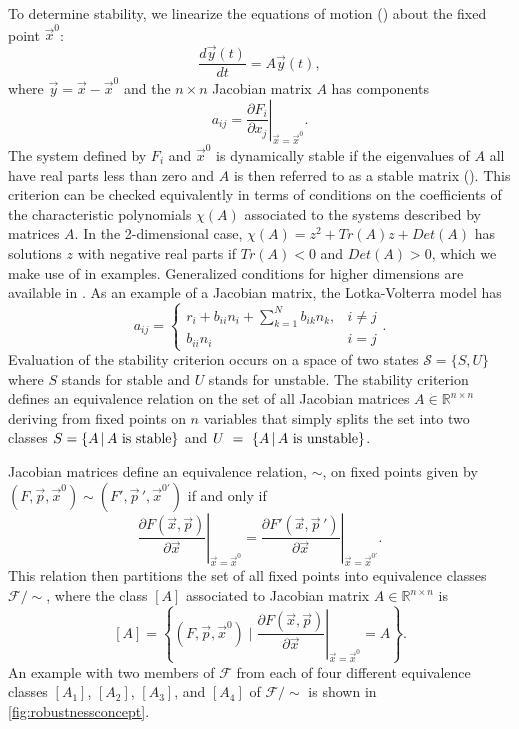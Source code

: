 To determine stability, we linearize the equations of motion () about the
fixed point $\vec{x}^0$:
\begin{equation}\label{eq:lineardynsys}
\frac{d\vec{y}(t)}{dt} = A \vec{y}(t),
\end{equation}
where $\vec{y} = \vec{x} - \vec{x}^0$ and the $n \times n$ Jacobian matrix $A$ has components
$$
a_{ij} = \left. \frac{\partial F_i}{\partial x_j} \right|_{\vec{x} = \vec{x}^0}.
$$
The system defined by $F_i$ and $\vec{x}^0$ is dynamically stable if the eigenvalues of $A$ all have real parts less than zero and $A$ is then referred to as a stable matrix (). This criterion can be checked equivalently in terms of conditions on the coefficients of the characteristic polynomials $\chi(A)$ associated to the systems described by matrices $A$. In the 2-dimensional case, $\chi(A) = z^2 + Tr(A)z+Det(A)$ has solutions $z$ with negative real parts if $Tr(A)<0$ and $Det(A)>0$, which we make use of in examples. Generalized conditions for higher dimensions are available in \cite{Gantmacher1959}. As an example of a Jacobian matrix, the Lotka-Volterra model has
 \begin{equation}\label{eq:lotkavolterrajacobian}
   a_{ij} = \left\{
     \begin{array}{lr}
       r_i + b_{ii} n_i + \sum_{k=1}^{N} b_{ik} n_{k}, & i \neq j\\
       b_{ii} n_i & i=j
     \end{array}.
   \right.
\end{equation}
Evaluation of the stability criterion occurs on a space of two states $\mathcal{S} = \{ S, U \}$ where $S$ stands for stable and $U$ stands for unstable. The stability criterion defines an equivalence relation on the set of all Jacobian matrices $A \in \mathbb{R}^{n \times n}$ deriving from fixed points on $n$ variables that simply splits the set into two classes $S=\{ A \, | \, A \hbox{ is stable}  \}$ and $U~=~\{ A \, | \, A \hbox{ is unstable} \}$.

Jacobian matrices define an equivalence relation, $\sim$, on fixed points given by $(F,\vec{p},\vec{x}^0) \sim (F',\vec{p}\,',\vec{x}^{0'}) $ if and only if
\begin{equation}\label{eq:jaceqrel}
\left. \frac{\partial F(\vec{x},\vec{p})}{\partial \vec{x}} \right|_{\vec{x} = \vec{x}^0} =
\left. \frac{\partial F'(\vec{x},\vec{p}\,')}{\partial \vec{x}} \right|_{\vec{x} = \vec{x}^{0'}}.
\end{equation}
This relation then partitions the set of all fixed points into equivalence classes $\mathcal{F}/{\sim}$, where the class $[A]$ associated to Jacobian matrix $A \in \mathbb{R}^{n \times n}$ is
\begin{equation}\label{eq:jaceqs}
[A] = \left\{ (F,\vec{p},\vec{x}^0) \; | \; \left. \frac{\partial F(\vec{x},\vec{p})}{\partial \vec{x}} \right|_{\vec{x} = \vec{x}^0} = A \right\}.
\end{equation}
An example with two members of $\mathcal{F}$ from each of four different equivalence classes $[A_1]$, $[A_2]$, $[A_3]$, and $[A_4]$ of $\mathcal{F}/{\sim}$ is shown in \ref{fig:robustnessconcept}.

